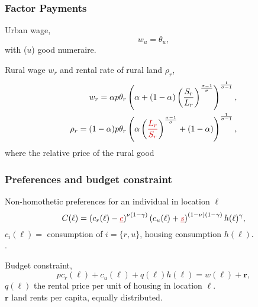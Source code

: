 \documentclass[aspectratio=169]{beamer}
\begin{document}
\begin{v75mins}
\begin{frame}
\frametitle{Factor Payments}

Urban wage,
\begin{equation*}w_u=\theta_u, \end{equation*}
with ($u$) good numeraire.

\bigskip
\pause
Rural wage $w_r$ and rental rate of rural land $\rho_r$,
\vspace{-0.5cm}
\begin{eqnarray*}
w_r=\alpha p\theta_r\left(\alpha  +(1-\alpha)\left(\frac{S_r}{L_r}\right)^{\frac{\sigma-1}{\sigma}} \right)^{\frac{1}{\sigma-1}}, \\
\rho_r=(1-\alpha)p\theta_r\left(\alpha \left(\re{\frac{L_r}{S_r}}\right)^{\frac{\sigma-1}{\sigma}} +(1-\alpha) \right)^{\frac{1}{\sigma-1}},
\end{eqnarray*}
where  the relative price of the rural good\\
\end{frame}\end{v75mins}

\begin{frame}[label=preference]
\frametitle{Preferences and budget constraint}
\begin{midi}
\item Non-homothetic preferences for an individual in location $\ell$
\begin{equation*}
C(\ell)=\left( c_r(\ell)-\re{\underline{c}}\right)^{\nu(1-\gamma)} \left(c_u(\ell) + \re{\underline{s}}\right) ^{(1-\nu)(1-\gamma)}h(\ell)^\gamma,
\end{equation*}
$c_i(\ell)=$ consumption of $i=\{r,u\}$, housing consumption $h(\ell)$.\\
.\\
\item Budget constraint,
\begin{equation*}
pc_r(\ell)+c_u(\ell)+q(\ell)h(\ell)=w(\ell)+\mathbf{r},
\end{equation*}
$q(\ell)$ the rental price per unit of housing in location $\ell$.\\
$\mathbf{r}$ land rents per capita, equally distributed.
\end{midi}
\end{frame}
\end{document}
